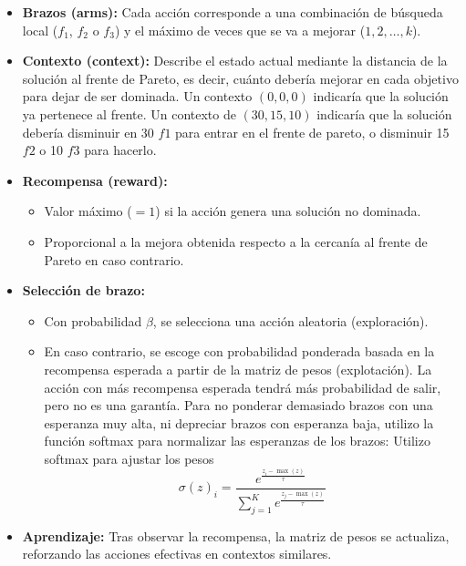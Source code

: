 \documentclass[12pt,a4paper]{book}
\begin{document}
\begin{itemize}
    \item \textbf{Brazos (arms):} Cada acción corresponde a una combinación de búsqueda local ($f_1$, $f_2$ o $f_3$) y el máximo de veces que se va a mejorar ($1, 2, \dots, k$).
    \item \textbf{Contexto (context):} Describe el estado actual mediante la distancia de la solución al frente de Pareto, es decir, cuánto debería mejorar en cada objetivo para dejar de ser dominada.
    Un contexto $(0,0,0)$ indicaría que la solución ya pertenece al frente. Un contexto de $(30,15,10)$ indicaría que la solución debería disminuir en 30 $f1$ para entrar en el frente de pareto, o disminuir 15 $f2$ o 10 $f3$ para hacerlo.
    \item \textbf{Recompensa (reward):}
    \begin{itemize}
        \item Valor máximo ($=1$) si la acción genera una solución no dominada.
        \item Proporcional a la mejora obtenida respecto a la cercanía al frente de Pareto en caso contrario.
    \end{itemize}
    \item \textbf{Selección de brazo:}
    \begin{itemize}
        \item Con probabilidad $\beta$, se selecciona una acción aleatoria (exploración).
        \item En caso contrario, se escoge con probabilidad ponderada basada en la recompensa esperada a partir de la matriz de pesos (explotación). La acción con más recompensa esperada tendrá más probabilidad de salir, pero no es una garantía.
        Para no ponderar demasiado brazos con una esperanza muy alta, ni depreciar brazos con esperanza baja, utilizo la función softmax para normalizar las esperanzas de los brazos:
        Utilizo softmax para ajustar los pesos
\begin{equation}
    \sigma(z)_i = \frac{e^{\frac{z_i - \max(z)}{\tau}}}{\sum_{j=1}^{K} e^{\frac{z_j - \max(z)}{\tau}}}
\end{equation}


    \end{itemize}
    \item \textbf{Aprendizaje:} Tras observar la recompensa, la matriz de pesos se actualiza, reforzando las acciones efectivas en contextos similares.
\end{itemize}
\end{document}
